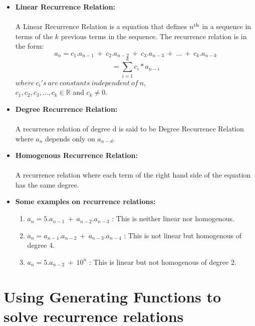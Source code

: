 \begin{itemize}
	\item \textbf{Linear Recurrence Relation:}\\ \\A Linear Recurrence Relation is a equation that defines  $n\textsuperscript{th}$ in a sequence in terms of the $k$ previous terms in the sequence. The recurrence relation is in the form:\\$$a_n = c_1.a_{n-1}~+~c_2.a_{n-2}~+~c_3.a_{n-3}~+~\dots~+~ c_k.a_{n-k}$$ $$ =\sum_{i=1}^{k} c_i*a_{n-i}$$ $where~c_i's~are~constants~independent~of~n$,\\ $c_1,c_2,c_3,\dots,c_k \in \mathbb{R} $ and $c_k \neq 0$.
	
	\item \textbf{Degree Recurrence Relation:}\\ \\A recurrence relation of degree d is said to be Degree Recurrence Relation where $a_n$ depends only on $a_{n-d}$.
	
	\item \textbf{Homogenous Recurrence Relation:}\\ \\ A recurrence relation where each term of the right hand side of the equation has the same degree.
		
	\item \textbf{Some examples on recurrence relations:}
	\begin{enumerate}
		\item $a_n = 5.a_{n-1}~+~a_{n-2}.a_{n-3}$ : This is neither linear nor homogenous.
		\item $a_n = a_{n-1}.a_{n-2}~+~a_{n-3}.a_{n-4}$ : This is not linear but homogenous of degree 4.
		\item $a_n = 5.a_{n-2}~+~10^n$ : This is linear but not homogenous of degree 2.
	\end{enumerate}
\end{itemize}

\section{Using Generating Functions to solve recurrence relations}

